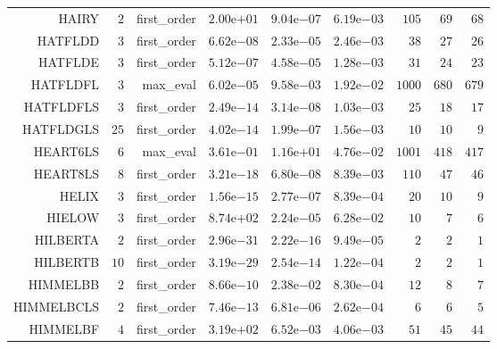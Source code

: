 \begin{longtable}{rrrrrrrrr}
HAIRY & \(     2\) & first\_order & \( 2.00\)e\(+01\) & \( 9.04\)e\(-07\) & \( 6.19\)e\(-03\) & \(   105\) & \(    69\) & \(    68\) \\
HATFLDD & \(     3\) & first\_order & \( 6.62\)e\(-08\) & \( 2.33\)e\(-05\) & \( 2.46\)e\(-03\) & \(    38\) & \(    27\) & \(    26\) \\
HATFLDE & \(     3\) & first\_order & \( 5.12\)e\(-07\) & \( 4.58\)e\(-05\) & \( 1.28\)e\(-03\) & \(    31\) & \(    24\) & \(    23\) \\
HATFLDFL & \(     3\) & max\_eval & \( 6.02\)e\(-05\) & \( 9.58\)e\(-03\) & \( 1.92\)e\(-02\) & \(  1000\) & \(   680\) & \(   679\) \\
HATFLDFLS & \(     3\) & first\_order & \( 2.49\)e\(-14\) & \( 3.14\)e\(-08\) & \( 1.03\)e\(-03\) & \(    25\) & \(    18\) & \(    17\) \\
HATFLDGLS & \(    25\) & first\_order & \( 4.02\)e\(-14\) & \( 1.99\)e\(-07\) & \( 1.56\)e\(-03\) & \(    10\) & \(    10\) & \(     9\) \\
HEART6LS & \(     6\) & max\_eval & \( 3.61\)e\(-01\) & \( 1.16\)e\(+01\) & \( 4.76\)e\(-02\) & \(  1001\) & \(   418\) & \(   417\) \\
HEART8LS & \(     8\) & first\_order & \( 3.21\)e\(-18\) & \( 6.80\)e\(-08\) & \( 8.39\)e\(-03\) & \(   110\) & \(    47\) & \(    46\) \\
HELIX & \(     3\) & first\_order & \( 1.56\)e\(-15\) & \( 2.77\)e\(-07\) & \( 8.39\)e\(-04\) & \(    20\) & \(    10\) & \(     9\) \\
HIELOW & \(     3\) & first\_order & \( 8.74\)e\(+02\) & \( 2.24\)e\(-05\) & \( 6.28\)e\(-02\) & \(    10\) & \(     7\) & \(     6\) \\
HILBERTA & \(     2\) & first\_order & \( 2.96\)e\(-31\) & \( 2.22\)e\(-16\) & \( 9.49\)e\(-05\) & \(     2\) & \(     2\) & \(     1\) \\
HILBERTB & \(    10\) & first\_order & \( 3.19\)e\(-29\) & \( 2.54\)e\(-14\) & \( 1.22\)e\(-04\) & \(     2\) & \(     2\) & \(     1\) \\
HIMMELBB & \(     2\) & first\_order & \( 8.66\)e\(-10\) & \( 2.38\)e\(-02\) & \( 8.30\)e\(-04\) & \(    12\) & \(     8\) & \(     7\) \\
HIMMELBCLS & \(     2\) & first\_order & \( 7.46\)e\(-13\) & \( 6.81\)e\(-06\) & \( 2.62\)e\(-04\) & \(     6\) & \(     6\) & \(     5\) \\
HIMMELBF & \(     4\) & first\_order & \( 3.19\)e\(+02\) & \( 6.52\)e\(-03\) & \( 4.06\)e\(-03\) & \(    51\) & \(    45\) & \(    44\) \\

\end{longtable}
